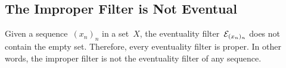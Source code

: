 \subsection{The Improper Filter is Not Eventual}

Given a sequence~$(x_n)_n$ in a set~$X$, the eventuality filter~$\mathcal{E}_{(x_n)_n}$ does not contain the empty set.
Therefore, every eventuality filter is proper.
In other words, the improper filter is not the eventuality filter of any sequence.
